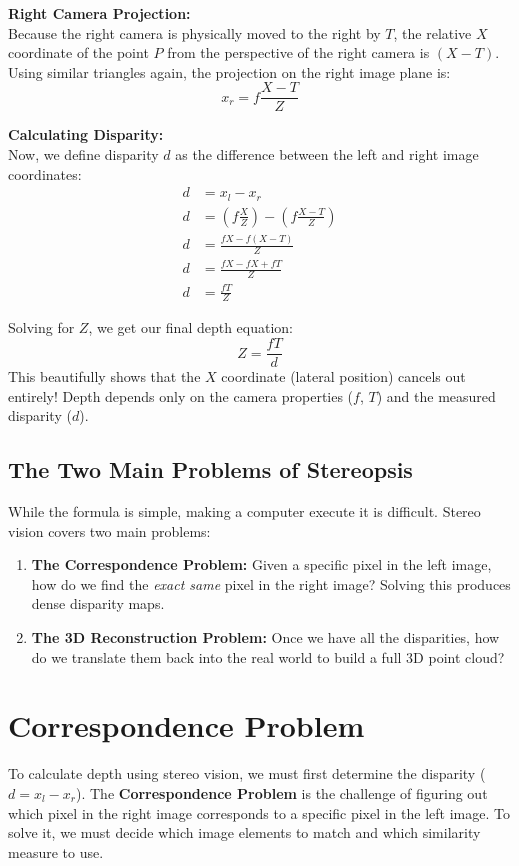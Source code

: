 \documentclass{report}
\begin{document}
\textbf{Right Camera Projection:}\\
Because the right camera is physically moved to the right by $T$, the relative $X$ coordinate of the point $P$ from the perspective of the right camera is $(X - T)$. Using similar triangles again, the projection on the right image plane is:
\begin{equation}
x_r = f \frac{X - T}{Z}
\end{equation}

\textbf{Calculating Disparity:}\\
Now, we define disparity $d$ as the difference between the left and right image coordinates:
\begin{align*}
d &= x_l - x_r \\
d &= \left( f \frac{X}{Z} \right) - \left( f \frac{X - T}{Z} \right) \\
d &= \frac{fX - f(X - T)}{Z} \\
d &= \frac{fX - fX + fT}{Z} \\
d &= \frac{fT}{Z}
\end{align*}

Solving for $Z$, we get our final depth equation:
\begin{equation}
Z = \frac{fT}{d}
\end{equation}
This beautifully shows that the $X$ coordinate (lateral position) cancels out entirely! Depth depends only on the camera properties ($f$, $T$) and the measured disparity ($d$).

\section{The Two Main Problems of Stereopsis}
While the formula is simple, making a computer execute it is difficult. Stereo vision covers two main problems:
\begin{enumerate}
    \item \textbf{The Correspondence Problem:} Given a specific pixel in the left image, how do we find the \textit{exact same} pixel in the right image? Solving this produces dense disparity maps.
    \item \textbf{The 3D Reconstruction Problem:} Once we have all the disparities, how do we translate them back into the real world to build a full 3D point cloud?
\end{enumerate}




\chapter{Correspondence Problem}
To calculate depth using stereo vision, we must first determine the disparity ($d = x_l - x_r$). The \textbf{Correspondence Problem} is
the challenge of figuring out which pixel in the right image corresponds to a specific pixel in the left image. To solve it, we must decide
which image elements to match and which similarity measure to use.
\end{document}
